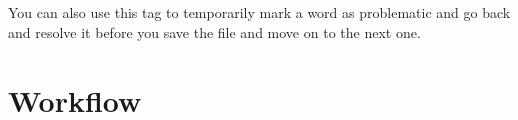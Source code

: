 \documentclass[a4paper,11pt]{article}
\begin{document}
You can also use this tag to temporarily mark a word as problematic
and go back and resolve it before you save the file and move on to the
next one.





\section{Workflow}
\end{document}
